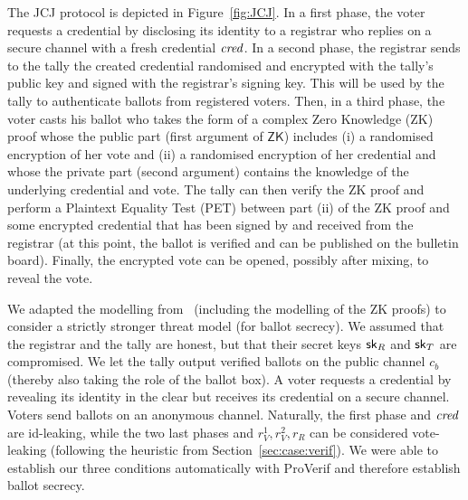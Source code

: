 The JCJ protocol is depicted in Figure~\ref{fig:JCJ}.
In a first phase, the voter requests a credential by disclosing its identity to a registrar who replies on a secure channel
with a fresh credential $\mathit{cred}$. In a second phase, the registrar sends to the tally the created credential randomised and encrypted
with the tally's public key and signed with the registrar's signing key. This will be used by the tally to authenticate
ballots from registered voters.
Then, in a third phase, the voter casts his ballot who takes the form of a complex Zero Knowledge (ZK) proof whose the public part
(first argument of $\mathsf{ZK}$) includes
(i) a randomised encryption of her vote and (ii) a randomised encryption of her credential and
whose the private part (second argument) contains the knowledge of the underlying credential and vote.
The tally can then verify the ZK proof and perform a Plaintext Equality Test (PET) between part (ii)
of the ZK proof and some encrypted credential that has been signed by and received from the registrar
(at this point, the ballot is verified and can be published on the bulletin board).
Finally, the encrypted vote can be opened, possibly after mixing, to reveal the vote.




We adapted the modelling from~\cite{vote-CSF08-maffei} (including the modelling of the ZK proofs)
to consider a strictly stronger threat model (for ballot secrecy).
We assumed that the registrar and the tally are honest, but that their secret keys $\mathsf{sk}_R$ and $\mathsf{sk}_T$ are compromised.
We let the tally output verified ballots on the public channel $c_b$
(thereby also taking the role of the ballot box).
A voter requests a credential by revealing its identity in the clear but receives its credential on a secure channel.
Voters send ballots on an anonymous channel.
Naturally, the first phase and $\mathit{cred}$
are id-leaking, while the two last phases and $r_V^1,r_V^2,r_R$ can be considered vote-leaking (following the heuristic from Section~\ref{sec:case:verif}).
We were able to establish our three conditions automatically with ProVerif and therefore establish ballot secrecy.

